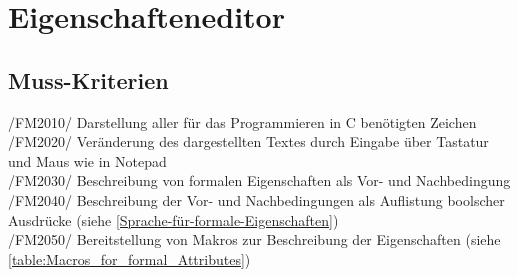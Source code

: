 \documentclass[a4paper]{scrreprt}
\begin{document}
\section{Eigenschafteneditor}
\subsection{Muss-Kriterien}
/FM2010/ Darstellung aller für das Programmieren in C benötigten Zeichen \\
/FM2020/ Veränderung des dargestellten Textes durch Eingabe über Tastatur und Maus wie in Notepad \\
/FM2030/ Beschreibung von formalen Eigenschaften als Vor- und Nachbedingung  \\
/FM2040/ Beschreibung der Vor- und Nachbedingungen als Auflistung boolscher Ausdrücke (siehe \ref{Sprache-für-formale-Eigenschaften})\\
/FM2050/ Bereitstellung von Makros zur Beschreibung der Eigenschaften (siehe \ref{table:Macros_for_formal_Attributes}) \\
\end{document}

